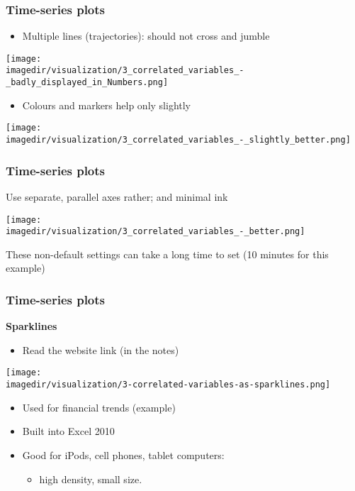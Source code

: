 \begin{frame}\frametitle{Time-series plots}
	\begin{itemize}
		\item	Multiple lines (trajectories): should not cross and jumble 
	\end{itemize}
	\begin{center}
		\texttt{[image: \\imagedir/visualization/3\_correlated\_variables\_-\_badly\_displayed\_in\_Numbers.png]}
	\end{center}
	\begin{itemize}
		\item	Colours and markers help only slightly 
	\end{itemize}
	\begin{center}
		\texttt{[image: \\imagedir/visualization/3\_correlated\_variables\_-\_slightly\_better.png]}
	\end{center}
\end{frame}

\begin{frame}\frametitle{Time-series plots}
	
	Use separate, parallel axes rather; and minimal ink 
	\begin{center}
		\texttt{[image: \\imagedir/visualization/3\_correlated\_variables\_-\_better.png]}
	\end{center}
	These non-default settings can take a long time to set (10 minutes for this example)
\end{frame}

\begin{frame}\frametitle{Time-series plots}
	
	\textbf{Sparklines}
	\begin{itemize}
		\item	Read the website link (in the notes) 
	\end{itemize}
	\begin{center}
		\texttt{[image: \\imagedir/visualization/3-correlated-variables-as-sparklines.png]}
	\end{center}
	\begin{itemize}
		\item	Used for financial trends (example) 
		\item	Built into Excel 2010 
		\item	Good for iPods, cell phones, tablet computers: 
		\begin{itemize}
			\item	high density, small size. 
		\end{itemize}
	\end{itemize}
\end{frame}

